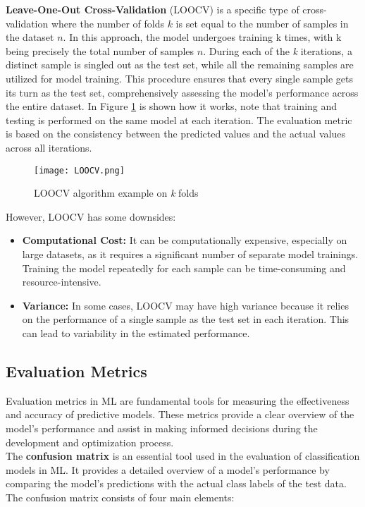 \textbf{Leave-One-Out Cross-Validation} (LOOCV) is a specific type of cross-validation where the number of folds $k$ is set equal to the number of samples in the dataset $n$. 
In this approach, the model undergoes training k times, with k being precisely the total number of samples $n$.
During each of the \textit{k} iterations, a distinct sample is singled out as the test set, while all the remaining samples are utilized for model training. 
This procedure ensures that every single sample gets its turn as the test set, comprehensively assessing the model's performance across the entire dataset.
In Figure \ref{fig:LOOCV} is shown how it works, note that training and testing is performed on the same model at each iteration.
The evaluation metric is based on the consistency between the predicted values and the actual values across all iterations.

\begin{figure}[H]
  \centering  
    \texttt{[image: LOOCV.png]}
    \caption{LOOCV algorithm example on \textit{k} folds}
    \label{fig:LOOCV}
\end{figure}

However, LOOCV has some downsides:
\begin{itemize}
  \item \textbf{Computational Cost:} It can be computationally expensive, especially on large datasets, as it requires a significant number of separate model trainings. 
  Training the model repeatedly for each sample can be time-consuming and resource-intensive.
  \item \textbf{Variance:} In some cases, LOOCV may have high variance because it relies on the performance of a single sample as the test set in each iteration. 
  This can lead to variability in the estimated performance.
\end{itemize}  
    
\subsection{Evaluation Metrics}
\label{subsec:evaluation_metrics}

Evaluation metrics in ML are fundamental tools for measuring the effectiveness and accuracy of predictive models.
These metrics provide a clear overview of the model's performance and assist in making informed decisions during the development and optimization process. \\

The \textbf{confusion matrix} is an essential tool used in the evaluation of classification models in ML.
It provides a detailed overview of a model's performance by comparing the model's predictions with the actual class labels of the test data. \\
The confusion matrix consists of four main elements:

